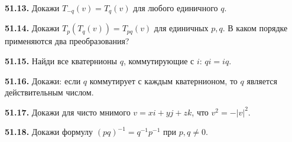 \noindent\begin{minipage}[t]{\linewidth}\textbf{51.13.} Докажи \(T_{-q}(v)=T_q(v)\) для любого единичного \(q\).\par\end{minipage}\par
\noindent\begin{minipage}[t]{\linewidth}\textbf{51.14.}\starmark{} Докажи \(T_p(T_q(v))=T_{pq}(v)\) для единичных \(p,q\). В каком порядке применяются два преобразования?\par\end{minipage}\par
\noindent\begin{minipage}[t]{\linewidth}\textbf{51.15.}\starmark{} Найди все кватернионы \(q\), коммутирующие с \(i\): \(qi=iq\).\par\end{minipage}\par
\noindent\begin{minipage}[t]{\linewidth}\textbf{51.16.}\starmark{} Докажи: если \(q\) коммутирует с каждым кватернионом, то \(q\) является действительным числом.\par\end{minipage}\par
\noindent\begin{minipage}[t]{\linewidth}\textbf{51.17.}\starmark{} Докажи для чисто мнимого \(v=xi+yj+zk\), что \(v^2=-|v|^2\).\par\end{minipage}\par
\noindent\begin{minipage}[t]{\linewidth}\textbf{51.18.}\starmark{} Докажи формулу \((pq)^{-1}=q^{-1}p^{-1}\) при \(p,q\ne0\).\par\end{minipage}\par
\endgroup
